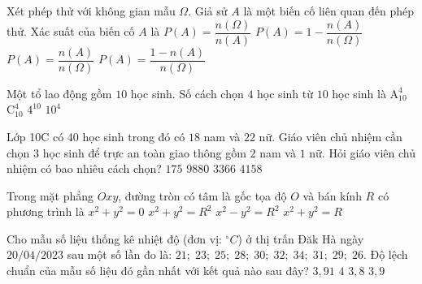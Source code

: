 \begin{ex}%
Xét phép thử với không gian mẫu $\Omega$. Giả sử $A$ là một biến cố liên quan đến phép thử. Xác suất của biến cố $A$ là
\choice
{$ P(A)=\dfrac{n(\Omega)}{n(A)}$}
{$ P(A)=1-\dfrac{n(A)}{n(\Omega)}$}
{\True $ P(A)=\dfrac{n(A)}{n(\Omega)}$}
{$ P(A)=\dfrac{1-n(A)}{n(\Omega)}$}
\end{ex}

\begin{ex}%
Một tổ lao động gồm $10$ học sinh. Số cách chọn $4$ học sinh từ $10$ học sinh là
\choice
{$\mathrm{A}_{10}^4$}
{\True $\mathrm{C}_{10}^4$}
{$4^{10}$}
{$10^4$}
\end{ex}

\begin{ex}%
Lớp 10C có $40$ học sinh trong đó có $18$ nam và $22$ nữ. Giáo viên chủ nhiệm cần chọn $3$ học sinh để trực an toàn giao thông gồm $2$ nam và $1$ nữ. Hỏi giáo viên chủ nhiệm có bao nhiêu cách chọn?
\choice
{$175$}
{$9880$}
{\True $3366$}
{$ 4158$}
\end{ex}

\begin{ex}%
Trong mặt phẳng $Oxy$, đường tròn có tâm là gốc tọa độ $O$ và bán kính $R$ có phương trình là
\choice
{$x^2+y^2=0$}
{\True $x^2+y^2=R^2$}
{$x^2-y^2=R^2$}
{$x^2+y^2=R$}
\end{ex}

\begin{ex}%
Cho mẫu số liệu thống kê nhiệt độ (đơn vị: $^\circ C$) ở thị trấn Đăk Hà ngày $20/04/2023$ sau một số lần đo là: $ 21; \; 23; \; 25; \; 28; \; 30; \; 32; \; 34; \; 31; \; 29; \; 26$. Độ lệch chuẩn của mẫu số liệu đó gần nhất với kết quả nào sau đây?
\choice
{\True $3,91$}
{$4$}
{$3,8$}
{$3,9$}
\end{ex}

